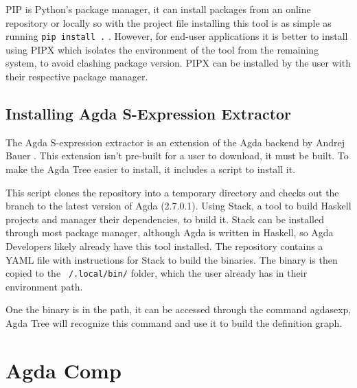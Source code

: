 PIP is Python's package manager, it can install packages from an online
repository or locally so with the project file installing this tool is as
simple as running \texttt{pip install .} . However, for end-user applications
it is better to install using PIPX which isolates the environment of the tool
from the remaining system, to avoid clashing package version. PIPX can be
installed by the user with their respective package manager.


\subsection{Installing Agda S-Expression Extractor}


The Agda S-expression extractor is an extension of the Agda backend by Andrej
Bauer \cite{andrej}. This extension isn't pre-built for a user to download, it
must be built. To make the Agda Tree easier to install, it includes a script to
install it.

This script clones the repository into a temporary directory and checks out the
branch to the latest version of Agda (2.7.0.1). Using Stack, a tool to build
Haskell projects and manager their dependencies, to build it. Stack can be
installed through most package manager, although Agda is written in Haskell, so
Agda Developers likely already have this tool installed. The repository
contains a YAML file with instructions for Stack to build the binaries. The
binary is then copied to the \texttt{~/.local/bin/} folder, which the user
already has in their environment path. 

One the binary is in the path, it can be accessed through the command
\textsf{agdasexp}, Agda Tree will recognize this command and use it to build
the definition graph.


\section{Agda Comp}

